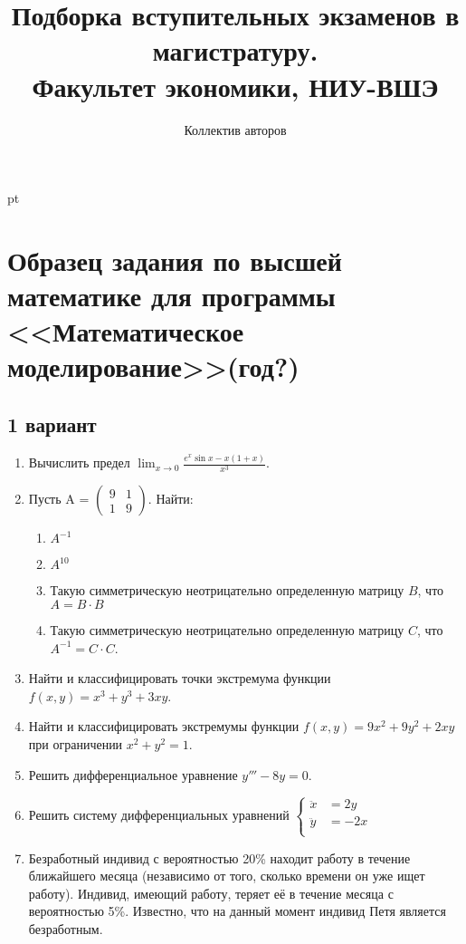 \documentclass[pdftex,12pt,a4paper]{article}
\title{Подборка вступительных экзаменов в магистратуру. \\Факультет экономики, НИУ-ВШЭ}
\author{Коллектив авторов}
\begin{document}
 pt %

\maketitle

\tableofcontents

\section{Образец задания по высшей математике для программы <<Математическое моделирование>>(год?)}
\subsection{1 вариант}
\begin{enumerate}
\item Вычислить предел $\lim_{x\to 0}\frac{e^x \sin x-x(1+x)}{x^3}$.\\
\item Пусть A =
$\left(\begin{array}{cc}
9 & 1\\
1 & 9
\end{array}\right)$. Найти:
\begin{enumerate}
\item $A^{-1}$
\item $A^{10}$
\item Такую симметрическую неотрицательно определенную матрицу $B$, что $A=B\cdot B$
\item Такую симметрическую неотрицательно определенную матрицу $C$, что $A^{-1}=C\cdot C$.
\end{enumerate}
\item Найти и классифицировать точки экстремума функции $f(x,y)=x^3+y^3+3xy$.\\
\item Найти и классифицировать экстремумы функции $f(x,y)=9x^2+9y^2+2xy$ при ограничении 
$x^2+y^2=1$.\\
\item Решить дифференциальное уравнение $y'''-8y=0$.\\
\item Решить систему дифференциальных уравнений 
$\left\{ \begin{aligned}
\ddot{x}&=2y\\
\ddot{y}&=-2x\\
\end{aligned} \right.$\\
\item Безработный индивид с вероятностью 20\% находит работу в течение ближайшего месяца (независимо от того, сколько времени он уже ищет работу). Индивид, имеющий работу, теряет её в течение месяца с вероятностью 5\%. Известно, что на данный момент индивид Петя является безработным.

\end{enumerate}
\end{document}
